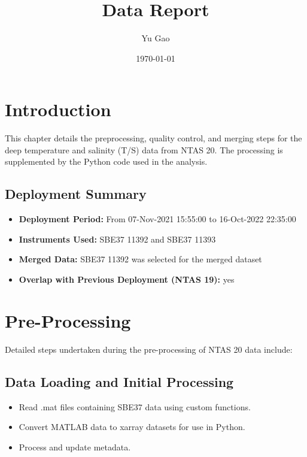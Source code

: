 \documentclass[11pt]{article}
\title{\displayprojectname{} \casenumber{} Data Report}
\author{Yu Gao}
\date{\today}
\newcommand{\HasNextDeploymentOverlap}{yes}  %
\newcommand{\projectname}{NTAS}  %
\newcommand{\casenumber}{20}  %
\newcommand{\previouscasenumber}{19}  %
\newcommand{\FirstInstrumentType}{SBE37}  %
\newcommand{\SecondInstrumentType}{SBE37}  %
\newcommand{\DeploymentSpike}{07-Nov-2021 15:55:00} %
\newcommand{\RecoverySpike}{16-Oct-2022 22:35:00} %
\newcommand{\FirstInstrument}{11392}
\newcommand{\SecondInstrument}{11393}
\newcommand{\CurrentDeploymentInstrument}{\FirstInstrumentType{} \FirstInstrument}  %
\begin{document}
\maketitle
\tableofcontents
\newpage

\section{Introduction}
This chapter details the preprocessing, quality control, 
and merging steps for the deep temperature and salinity (T/S) data from \projectname{} \casenumber{}.
The processing is supplemented by the Python code used in the analysis.

\subsection{Deployment Summary}
\begin{itemize}
    \item \textbf{Deployment Period:} From \DeploymentSpike{} to \RecoverySpike{}
    \item \textbf{Instruments Used:} \FirstInstrumentType{} \FirstInstrument{} and \SecondInstrumentType{} \SecondInstrument{}
    \item \textbf{Merged Data:} \CurrentDeploymentInstrument{} was selected for the merged dataset
    \item \textbf{Overlap with Previous Deployment (\projectname{} \previouscasenumber{}):} \HasNextDeploymentOverlap{}
\end{itemize}

\section{Pre-Processing}
Detailed steps undertaken during the pre-processing of \projectname{} \casenumber{} data include:

\subsection{Data Loading and Initial Processing}
\begin{itemize}
\item Read .mat files containing \FirstInstrumentType{} data using custom functions.
\item Convert MATLAB data to xarray datasets for use in Python.
\item Process and update metadata.
\end{itemize}
\end{document}
